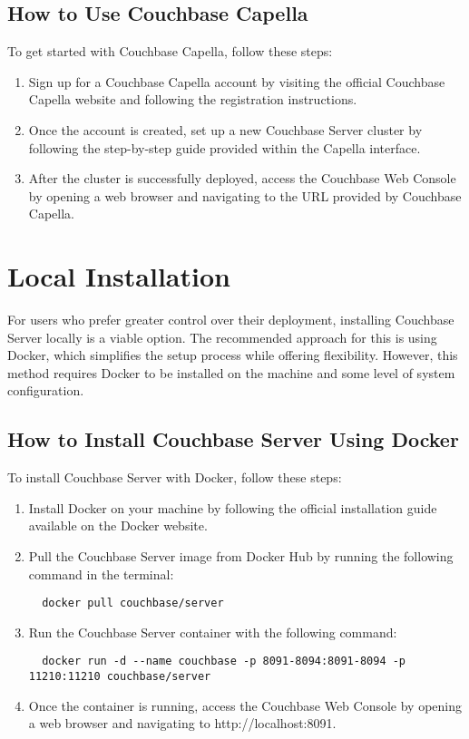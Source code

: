 \subsection{How to Use Couchbase Capella}
To get started with Couchbase Capella, follow these steps:

\begin{enumerate}
  \item Sign up for a Couchbase Capella account by visiting the official Couchbase Capella website and following the registration instructions. \cite{couchbaseCapellaSignUp}
  \item Once the account is created, set up a new Couchbase Server cluster by following the step-by-step guide provided within the Capella interface.
  \item After the cluster is successfully deployed, access the Couchbase Web Console by opening a web browser and navigating to the URL provided by Couchbase Capella.
\end{enumerate}

\section{Local Installation}
For users who prefer greater control over their deployment, installing Couchbase Server locally is a viable option. The recommended approach for this is using Docker, which simplifies the setup process while offering flexibility. However, this method requires Docker to be installed on the machine and some level of system configuration.

\subsection{How to Install Couchbase Server Using Docker}
To install Couchbase Server with Docker, follow these steps:

\begin{enumerate}
  \item Install Docker on your machine by following the official installation guide available on the Docker website.
  \item Pull the Couchbase Server image from Docker Hub by running the following command in the terminal:
  \begin{verbatim}
  docker pull couchbase/server
  \end{verbatim}
  \item Run the Couchbase Server container with the following command:
  \begin{verbatim}
  docker run -d --name couchbase -p 8091-8094:8091-8094 -p 11210:11210 couchbase/server
  \end{verbatim}
  \item Once the container is running, access the Couchbase Web Console by opening a web browser and navigating to http://localhost:8091.
\end{enumerate}

